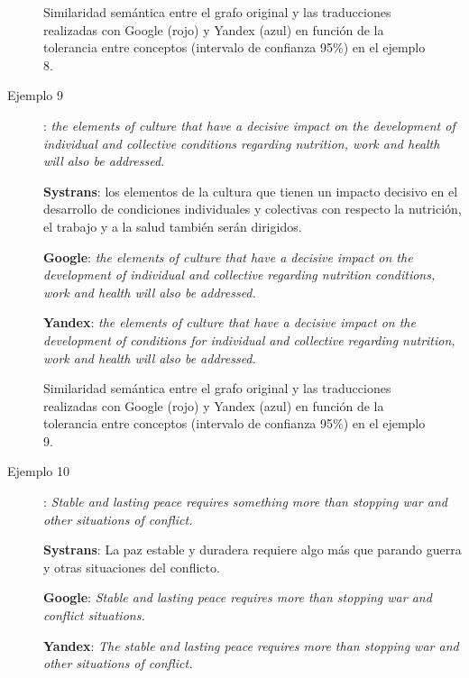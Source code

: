 \documentclass[a4paper,12pt,spanish]{book}
\begin{document}
\begin{figure}[htbp]
\centering
\capstart

\caption{Similaridad semántica entre el grafo original y las traducciones realizadas con Google (rojo) y Yandex (azul) en función de la tolerancia entre conceptos (intervalo de confianza 95\%) en el ejemplo 8.}\label{5.pruebas/index:sample08-relation-tol-0}\end{figure}
\begin{description}
\item[{Ejemplo 9}] \leavevmode
: \emph{the elements of culture that have a decisive impact on the development of individual and collective conditions regarding nutrition, work and health will also be addressed.}

\textbf{Systrans}: los elementos de la cultura que tienen un impacto decisivo en el desarrollo de condiciones individuales y colectivas con respecto la nutrición, el trabajo y a la salud también serán dirigidos.

\textbf{Google}: \emph{the elements of culture that have a decisive impact on the development of individual and collective regarding nutrition conditions, work and health will also be addressed.}

\textbf{Yandex}: \emph{the elements of culture that have a decisive impact on the development of conditions for individual and collective regarding nutrition, work and health will also be addressed.}

\end{description}
\begin{figure}[htbp]
\centering
\capstart

\caption{Similaridad semántica entre el grafo original y las traducciones realizadas con Google (rojo) y Yandex (azul) en función de la tolerancia entre conceptos (intervalo de confianza 95\%) en el ejemplo 9.}\label{5.pruebas/index:sample09-relation-tol-0}\end{figure}
\begin{description}
\item[{Ejemplo 10}] \leavevmode
: \emph{Stable and lasting peace requires something more than stopping war and other situations of conflict.}

\textbf{Systrans}: La paz estable y duradera requiere algo más que parando guerra y otras situaciones del conflicto.

\textbf{Google}: \emph{Stable and lasting peace requires more than stopping war and conflict situations.}

\textbf{Yandex}: \emph{The stable and lasting peace requires more than stopping war and other situations of conflict.}

\end{description}
\end{document}
